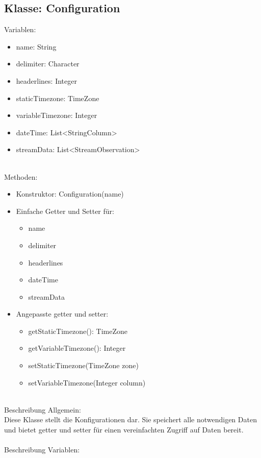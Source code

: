 
\subsection{Klasse: Configuration}
Variablen:

\begin{itemize}
	\item name: String
	\item delimiter: Character
	\item headerlines: Integer
	\item staticTimezone: TimeZone
	\item variableTimezone: Integer
	\item dateTime: List<StringColumn>
 	\item streamData: List<StreamObservation>
\end{itemize}
\ \\
Methoden:
\begin{itemize}
	\item Konstruktor: Configuration(name)
	\item Einfache Getter und Setter für:
	\begin{itemize}
		\item name
		\item delimiter
		\item headerlines
		\item dateTime
		\item streamData
	\end{itemize}

	\item Angepasste getter und setter:
	\begin{itemize}
		\item getStaticTimezone(): TimeZone
		\item getVariableTimezone(): Integer
		\item setStaticTimezone(TimeZone zone)
		\item setVariableTimezone(Integer column)
	\end{itemize}
\end{itemize}
\ \\
Beschreibung Allgemein: \\Diese Klasse stellt die Konfigurationen dar. Sie speichert
alle notwendigen Daten und bietet getter und setter für einen vereinfachten Zugriff auf Daten bereit.\\
\ \\
Beschreibung Variablen:
